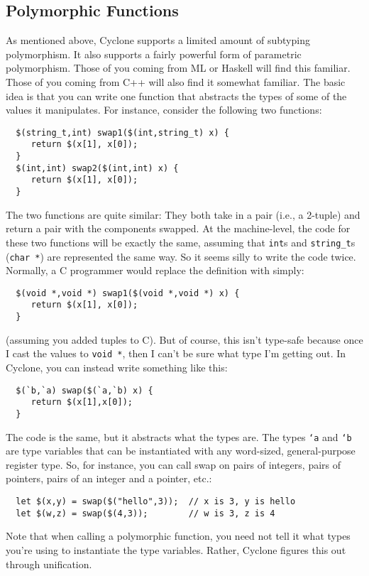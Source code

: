 \subsection{Polymorphic Functions}
As mentioned above, Cyclone supports a limited amount of subtyping
polymorphism.  It also supports a fairly powerful form of parametric
polymorphism.  Those of you coming from ML or Haskell will find this
familiar.  Those of you coming from C++ will also find it somewhat
familiar.  The basic idea is that you can write one function that
abstracts the types of some of the values it manipulates.  For
instance, consider the following two functions:
\begin{verbatim}
  $(string_t,int) swap1($(int,string_t) x) {
     return $(x[1], x[0]);
  }
  $(int,int) swap2($(int,int) x) {
     return $(x[1], x[0]);
  }
\end{verbatim}

The two functions are quite similar: They both take in a pair (i.e., a
2-tuple) and return a pair with the components swapped.  At the
machine-level, the code for these two functions will be exactly the
same, assuming that \texttt{int}s and \texttt{string_t}s (\texttt{char *}) are
represented the same way.  So it seems silly to write the code twice.
Normally, a C programmer would replace the definition with simply:
\begin{verbatim}
  $(void *,void *) swap1($(void *,void *) x) {
     return $(x[1], x[0]);
  }
\end{verbatim}
(assuming you added tuples to C).  But of course, this isn't type-safe
because once I cast the values to \texttt{void *}, then I can't be sure
what type I'm getting out.  In Cyclone, you can instead write
something like this:
\begin{verbatim}
  $(`b,`a) swap($(`a,`b) x) {
     return $(x[1],x[0]);
  }
\end{verbatim}
The code is the same, but it abstracts what the types are.  The types
\texttt{`a} and \texttt{`b} are type variables that can be instantiated
with any word-sized, general-purpose register type.  So, for instance,
you can call swap on pairs of integers, pairs of pointers, pairs of an
integer and a pointer, etc.:
\begin{verbatim}
  let $(x,y) = swap($("hello",3));  // x is 3, y is hello
  let $(w,z) = swap($(4,3));        // w is 3, z is 4
\end{verbatim}

Note that when calling a polymorphic function, you need not tell it
what types you're using to instantiate the type variables.  Rather,
Cyclone figures this out through unification.

